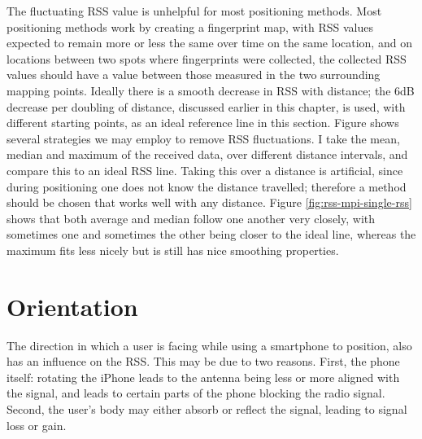The fluctuating RSS value is unhelpful for most positioning methods.
Most positioning methods work by creating a fingerprint map, with RSS values expected to remain more or less the same over time on the same location, and on locations between two spots where fingerprints were collected, the collected RSS values should have a value between those measured in the two surrounding mapping points.
Ideally there is a smooth decrease in RSS with distance; the 6dB decrease per doubling of distance, discussed earlier in this chapter, is used, with different starting points, as an ideal reference line in this section.
Figure  shows several strategies we may employ to remove RSS fluctuations.
I take the mean, median and maximum of the received data, over different distance intervals, and compare this to an ideal RSS line.
Taking this over a distance is artificial, since during positioning one does not know the distance travelled; therefore a method should be chosen that works well with any distance.
Figure \ref{fig:rss-mpi-single-rss} shows that both average and median follow one another very closely, with sometimes one and sometimes the other being closer to the ideal line, whereas the maximum fits less nicely but is still has nice smoothing properties.

\section{Orientation}
\label{sec:rss-rot}

The direction in which a user is facing while using a smartphone to position, also has an influence on the RSS.
This may be due to two reasons.
First, the phone itself: rotating the iPhone leads to the antenna being less or more aligned with the signal, and leads to certain parts of the phone blocking the radio signal.
Second, the user's body may either absorb or reflect the signal, leading to signal loss or gain.

